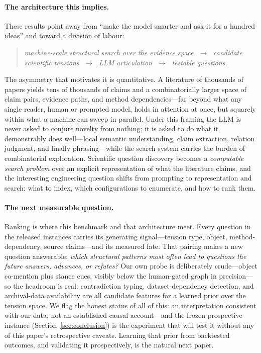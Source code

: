 \paragraph{The architecture this implies.} These results point away
from ``make the model smarter and ask it for a hundred ideas'' and
toward a division of labour:
\begin{quote}
\emph{machine-scale structural search over the evidence space
$\;\rightarrow\;$ candidate scientific tensions $\;\rightarrow\;$ LLM
articulation $\;\rightarrow\;$ testable questions.}
\end{quote}
The asymmetry that motivates it is quantitative. A literature of
thousands of papers yields tens of thousands of claims and a
combinatorially larger space of claim pairs, evidence paths, and
method dependencies---far beyond what any single reader, human or
prompted model, holds in attention at once, but squarely within what a
machine can sweep in parallel. Under this framing the LLM is never
asked to conjure novelty from nothing; it is asked to do what it
demonstrably does well---local semantic understanding, claim
extraction, relation judgment, and finally phrasing---while the search
system carries the burden of combinatorial exploration. Scientific
question discovery becomes a \emph{computable search problem} over an
explicit representation of what the literature claims, and the
interesting engineering question shifts from prompting to
representation and search: what to index, which configurations to
enumerate, and how to rank them.

\paragraph{The next measurable question.} Ranking is where this
benchmark and that architecture meet. Every question in the released
instances carries its generating signal---tension type, object,
method-dependency, source claims---and its measured fate. That pairing
makes a new question answerable: \emph{which structural patterns most
often lead to questions the future answers, advances, or
refutes?} Our own probe is deliberately crude---object co-mention plus
stance cues, visibly below the human-gated graph in precision---so the
headroom is real: contradiction typing, dataset-dependency detection,
and archival-data availability are all candidate features for a
learned prior over the tension space. We flag the honest status of all
of this: an interpretation consistent with our data, not an
established causal account---and the frozen prospective instance
(Section~\ref{sec:conclusion}) is the experiment that will test it
without any of this paper's retrospective caveats. Learning that prior
from backtested outcomes, and validating it prospectively, is the
natural next paper.
